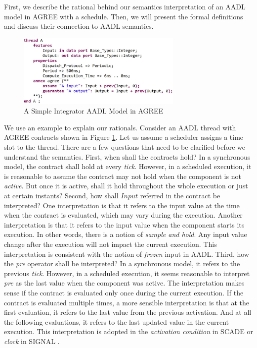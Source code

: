 
First, we describe the rational behind our semantics interpretation of an AADL model in AGREE with a schedule. Then, we will present the formal definitions and discuss their connection to AADL semantics.

\begin{figure}[ht!]
\centering
\includegraphics[width=80mm]{pre.jpg}
\caption{A Simple Integrator AADL Model in AGREE\label{integratorFig}}
\end{figure}

We use an example to explain our rationals. Consider an AADL thread with AGREE contracts shown in Figure \ref{integratorFig}. Let us assume a scheduler assigns a time slot to the thread. There are a few questions that need to be clarified before we understand the semantics. 
First, when shall the contracts hold? In a synchronous model, the contract shall hold at every \emph{tick}. However, in a scheduled execution, it is reasonable to assume the contract may not hold when the component is not \emph{active}. But once it is active, shall it hold throughout the whole execution or just at certain instants? 
Second, how shall $Input$ referred in the contract be interpreted? One interpretation is that it refers to the input value at the time when the contract is evaluated, which may vary during the execution. Another interpretation is that it refers to the input value when the component starts its execution. In other words, there is a notion of \emph{sample and hold}. Any input value change after the execution will not impact the current execution. This interpretation is consistent with the notion of \emph{frozen} input in AADL.
Third, how the \emph{pre} operator shall be interpreted? In a synchronous model, it refers to the previous \emph{tick}. However, in a scheduled execution, it seems reasonable to interpret \emph{pre} as the last value when the component was active. The interpretation makes sense if the contract is evaluated only once during the current execution. If the contract is evaluated multiple times, a more sensible interpretation is that at the first evaluation, it refers to the last value from the previous activation. And at all the following evaluations, it refers to the last updated value in the current execution. This interpretation is adopted in the \emph{activation condition} in SCADE \cite{scade} or \emph{clock} in SIGNAL \cite{signal}.

